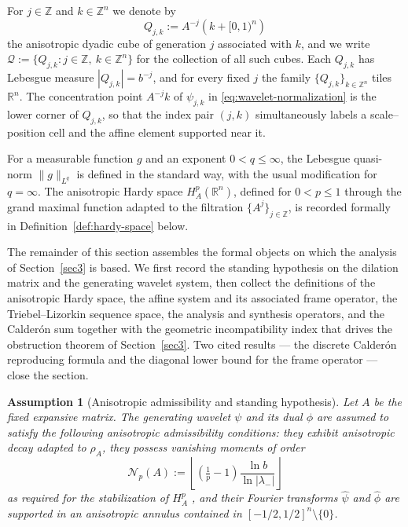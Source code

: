\documentclass[pdflatex,sn-basic,Numbered]{sn-jnl}
\theoremstyle{thmstyleone}%
\theoremstyle{thmstylethree}%
\newtheorem{assumption}{Assumption}
\begin{document}
For $j \in \mathbb{Z}$ and $k \in \mathbb{Z}^n$ we denote by
\begin{equation}\label{eq:dyadic-cube}
	Q_{j,k} := A^{-j}\!\left(k + [0,1)^n\right)
\end{equation}
the anisotropic dyadic cube of generation $j$ associated with $k$, and we write
$\mathcal{Q} := \{Q_{j,k} : j \in \mathbb{Z},\ k \in \mathbb{Z}^n\}$ for the
collection of all such cubes. Each $Q_{j,k}$ has Lebesgue measure $|Q_{j,k}| =
b^{-j}$, and for every fixed $j$ the family $\{Q_{j,k}\}_{k \in \mathbb{Z}^n}$
tiles $\mathbb{R}^n$. The concentration point $A^{-j}k$ of $\psi_{j,k}$ in
\eqref{eq:wavelet-normalization} is the lower corner of $Q_{j,k}$, so that the
index pair $(j,k)$ simultaneously labels a scale--position cell and the affine
element supported near it.

For a measurable function $g$ and an exponent $0 < q \le \infty$, the Lebesgue
quasi-norm $\|g\|_{L^q}$ is defined in the standard way, with the usual
modification for $q = \infty$. The anisotropic Hardy space
$H^p_A(\mathbb{R}^n)$, defined for $0 < p \le 1$ through the grand maximal
function adapted to the filtration $\{A^j\}_{j \in \mathbb{Z}}$, is recorded
formally in Definition~\ref{def:hardy-space} below.



The remainder of this section assembles the formal objects on which the
analysis of Section~\ref{sec3} is based. We first record the standing
hypothesis on the dilation matrix and the generating wavelet system, then
collect the definitions of the anisotropic Hardy space, the affine system and
its associated frame operator, the Triebel--Lizorkin sequence space, the
analysis and synthesis operators, and the Calder\'on sum together with the
geometric incompatibility index that drives the obstruction theorem of
Section~\ref{sec3}. Two cited results --- the discrete
Calder\'on reproducing formula and the diagonal lower bound for the frame
operator --- close the section.

\begin{assumption}[Anisotropic admissibility and standing hypothesis]\label{ass:standing-hypothesis}
	Let $A$ be the fixed expansive matrix. The generating
	wavelet $\psi$ and its dual $\phi$ are assumed to satisfy the following anisotropic
	admissibility conditions: they exhibit anisotropic decay adapted to $\rho_A$,
	they possess vanishing moments of order
	\begin{equation}\label{eq:vanishing-moment-order}
		\mathcal{N}_p(A):=\left\lfloor \left(\tfrac{1}{p}-1\right)
		\frac{\ln b}{\ln |\lambda_-|} \right\rfloor 
	\end{equation}
	as required for the stabilization of $H^p_A$
	\cite[Theorems 5.10 and 6.7]{Bownik2003}, and their Fourier transforms
	$\hat{\psi}$ and $\hat{\phi}$ are supported in an anisotropic annulus
	contained in $[-1/2, 1/2]^n \setminus \{0\}$.
\end{assumption}
\end{document}
